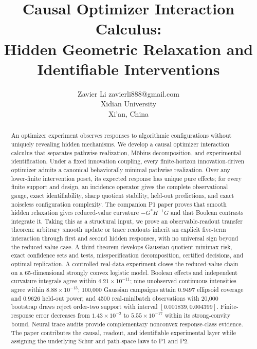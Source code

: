 \documentclass[10pt]{article}
\title{Causal Optimizer Interaction Calculus:\\
Hidden Geometric Relaxation and Identifiable Interventions}
\author{\name Zavier Li \email zavierli888@gmail.com\\
      \addr Xidian University\\
      \addr Xi'an, China}
\begin{document}
\maketitle

\begin{abstract}
An optimizer experiment observes responses to algorithmic configurations without uniquely revealing hidden mechanisms.  We develop a causal optimizer interaction calculus that separates pathwise realization, M\"obius decomposition, and experimental identification.  Under a fixed innovation coupling, every finite-horizon innovation-driven optimizer admits a canonical behaviorally minimal pathwise realization.  Over any lower-finite intervention poset, its expected response has unique pure effects; for every finite support and design, an incidence operator gives the complete observational gauge, exact identifiability, sharp quotient stability, held-out predictions, and exact noiseless configuration complexity.  The companion P1 paper proves that smooth hidden relaxation gives reduced-value curvature $-G^*H^{-1}G$ and that Boolean contrasts integrate it.  Taking this as a structural input, we prove an observable-readout transfer theorem: arbitrary smooth update or trace readouts inherit an explicit five-term interaction through first and second hidden responses, with no universal sign beyond the reduced-value case.  A third theorem develops Gaussian quotient minimax risk, exact confidence sets and tests, misspecification decomposition, certified decisions, and optimal replication.  A controlled real-data experiment closes the reduced-value chain on a 65-dimensional strongly convex logistic model.  Boolean effects and independent curvature integrals agree within $4.21\times10^{-11}$; nine unobserved continuous intensities agree within $8.88\times10^{-13}$; 100,000 Gaussian campaigns attain 0.9497 ellipsoid coverage and 0.9626 held-out power; and 4500 real-minibatch observations with 20,000 bootstrap draws reject order-two support with interval $[0.001839,0.004399]$.  Finite-response error decreases from $1.43\times10^{-2}$ to $5.55\times10^{-17}$ within its strong-convity bound.  Neural trace audits provide complementary nonconvex response-class evidence.  The paper contributes the causal, readout, and identifiable experimental layer while assigning the underlying Schur and path-space laws to P1 and P2.
\end{abstract}















\appendix





\end{document}
